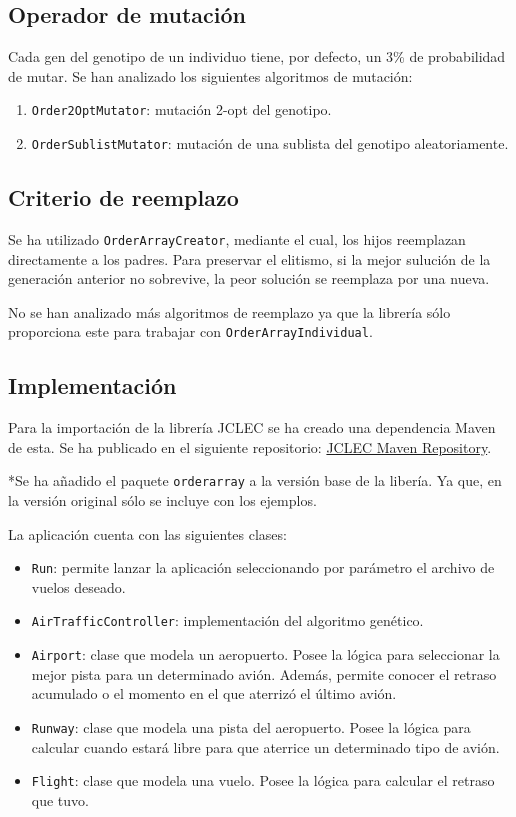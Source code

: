 \documentclass[a4paper,12pt,titlepage]{article}
\begin{document}
\subsection{Operador de mutación}

Cada gen del genotipo de un individuo tiene, por defecto, un 3\% de probabilidad de mutar. Se han analizado los siguientes algoritmos de mutación:

\begin{enumerate}[noitemsep]
	\item \lstinline|Order2OptMutator|: mutación 2-opt del genotipo.
	\item \lstinline|OrderSublistMutator|: mutación de una sublista del genotipo aleatoriamente.
\end{enumerate}

\subsection{Criterio de reemplazo}

Se ha utilizado \lstinline|OrderArrayCreator|, mediante el cual, los hijos reemplazan directamente a los padres. Para preservar el elitismo, si la mejor sulución de la generación anterior no sobrevive, la peor solución se reemplaza por una nueva.

No se han analizado más algoritmos de reemplazo ya que la librería sólo proporciona este para trabajar con \lstinline|OrderArrayIndividual|.

\subsection{Implementación}

Para la importación de la librería JCLEC se ha creado una dependencia Maven de esta. Se ha publicado en el siguiente repositorio: \href{https://github.com/davidmigloz/jclec\_maven\_repo}{JCLEC Maven Repository}. 

*Se ha añadido el paquete \lstinline|orderarray| a la versión base de la libería. Ya que, en la versión original sólo se incluye con los ejemplos.

La aplicación cuenta con las siguientes clases:

\begin{itemize}[noitemsep]
	\item \lstinline|Run|: permite lanzar la aplicación seleccionando por parámetro el archivo de vuelos deseado.
	\item \lstinline|AirTrafficController|: implementación del algoritmo genético.
	\item \lstinline|Airport|: clase que modela un aeropuerto. Posee la lógica para seleccionar la mejor pista para un determinado avión. Además, permite conocer el retraso acumulado o el momento en el que aterrizó el último avión.
	\item \lstinline|Runway|: clase que modela una pista del aeropuerto. Posee la lógica para calcular cuando estará libre para que aterrice un determinado tipo de avión.
	\item \lstinline|Flight|: clase que modela una vuelo. Posee la lógica para calcular el retraso que tuvo.
\end{itemize}
\end{document}
